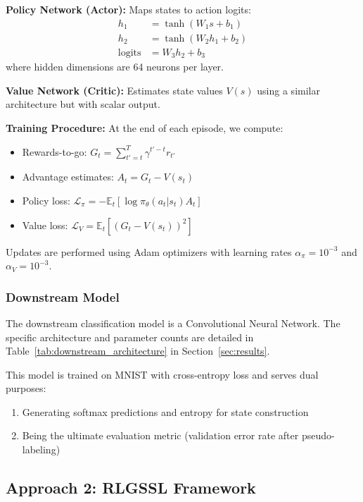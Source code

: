 \documentclass{scrartcl}
\begin{document}
\textbf{Policy Network (Actor):} Maps states to action logits:
\begin{align}
h_1 &= \tanh(W_1 s + b_1) \\
h_2 &= \tanh(W_2 h_1 + b_2) \\
\text{logits} &= W_3 h_2 + b_3
\end{align}
where hidden dimensions are 64 neurons per layer.

\textbf{Value Network (Critic):} Estimates state values $V(s)$ using a similar architecture but with scalar output.

\textbf{Training Procedure:} At the end of each episode, we compute:
\begin{itemize}
    \item Rewards-to-go: $G_t = \sum_{t'=t}^T \gamma^{t'-t} r_{t'}$
    \item Advantage estimates: $A_t = G_t - V(s_t)$
    \item Policy loss: $\mathcal{L}_\pi = -\mathbb{E}_t[\log \pi_\theta(a_t|s_t) A_t]$
    \item Value loss: $\mathcal{L}_V = \mathbb{E}_t[(G_t - V(s_t))^2]$
\end{itemize}

Updates are performed using Adam optimizers with learning rates $\alpha_\pi = 10^{-3}$ and $\alpha_V = 10^{-3}$.

\subsubsection{Downstream Model}

The downstream classification model is a Convolutional Neural Network. The specific architecture and parameter counts are detailed in Table~\ref{tab:downstream_architecture} in Section~\ref{sec:results}.

This model is trained on MNIST with cross-entropy loss and serves dual purposes:
\begin{enumerate}
    \item Generating softmax predictions and entropy for state construction
    \item Being the ultimate evaluation metric (validation error rate after pseudo-labeling)
\end{enumerate}

\subsection{Approach 2: RLGSSL Framework}
\end{document}

